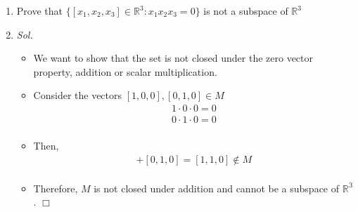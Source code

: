 \documentclass[11pt]{article}
\newcommand{\R}{\mathbb{R}}
\begin{document}
\begin{enumerate}
\begin{enumerate}
		\item Prove that $\{ [x_1,x_2,x_3] \in \R^3 \colon x_1 x_2 x_3 = 0 \}$ is not a subspace of $\R^3$
    \item[] \textit{ Sol. }
      \begin{itemize}
        \item[] We want to show that the set is not closed under the zero vector 
          property, addition or scalar multiplication. 
        \item[] Consider the vectors $[1, 0, 0], [0, 1, 0] \in M$ \begin{align*}
            1 \cdot 0 \cdot 0 = 0 \\
            0 \cdot 1 \cdot 0 = 0 \\
          \end{align*}
        \item[] Then, \begin{align*}
            [1, 0, 0] + [0, 1, 0] = [1, 1, 0] \notin M \\
          \end{align*}
        \item[] Therefore, $M$ is not closed under addition and cannot be a 
          subspace of $\mathbb{R^3}$. $\Box$
      \end{itemize}
	\end{enumerate}
\end{enumerate}
\end{document}
